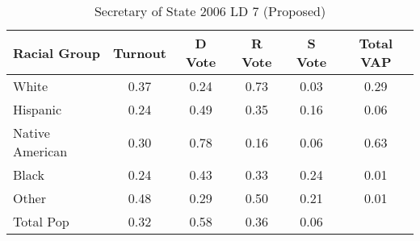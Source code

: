 \begin{table}[htb]
\begin{center}
\caption{Secretary of State 2006 LD 7 (Proposed)}
\label{sos06_vap_ld_7}
\begin{tabular}{lccccc}
  \hline
Racial Group & Turnout & D Vote & R Vote & S Vote & Total VAP \\ 
  \hline
White & 0.37 & 0.24 & 0.73 & 0.03 & 0.29 \\ 
  Hispanic & 0.24 & 0.49 & 0.35 & 0.16 & 0.06 \\ 
  Native American & 0.30 & 0.78 & 0.16 & 0.06 & 0.63 \\ 
  Black & 0.24 & 0.43 & 0.33 & 0.24 & 0.01 \\ 
  Other & 0.48 & 0.29 & 0.50 & 0.21 & 0.01 \\ 
  Total Pop & 0.32 & 0.58 & 0.36 & 0.06 &  \\ 
   \hline
\end{tabular}
\end{center}
\end{table}
